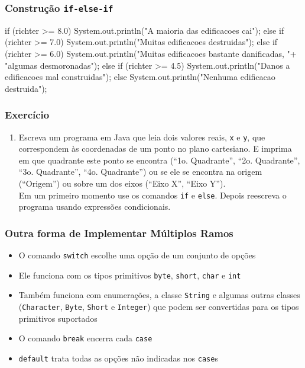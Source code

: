\documentclass[xcolor={dvipsnames,table},aspectratio=169]{beamer}
\begin{document}
\begin{frame}[fragile]\frametitle{Construção \texttt{if-else-if}}
{\footnotesize
\begin{javacode}
if (richter >= 8.0) {
   System.out.println("A maioria das edificacoes cai");
}
else if (richter >= 7.0) {
   System.out.println("Muitas edificacoes destruidas");
}
else if (richter >= 6.0) {
   System.out.println("Muitas edificacoes bastante danificadas, "+
                      "algumas desmoronadas");
}
else if (richter >= 4.5) {
   System.out.println("Danos a edificacoes mal construidas");
}
else {
   System.out.println("Nenhuma edificacao destruida");
}
\end{javacode}
}
\end{frame}

\begin{frame}\frametitle{Exercício}
\begin{enumerate}
	\item Escreva um programa em Java que leia dois valores reais, \texttt{x} e \texttt{y}, que correspondem às coordenadas de um ponto no plano cartesiano. E imprima em que quadrante este ponto se encontra (``1o. Quadrante'', ``2o. Quadrante'', ``3o. Quadrante'', ``4o. Quadrante'') ou se ele se encontra na origem (``Origem'') ou sobre um dos eixos (``Eixo X'', ``Eixo Y'').\\
Em um primeiro momento use os comandos \texttt{if} e \texttt{else}. Depois reescreva o programa usando expressões condicionais.
\end{enumerate}
\end{frame}

\begin{frame}\frametitle{Outra forma de Implementar Múltiplos Ramos}
\begin{itemize}
	\item O comando \texttt{switch} escolhe uma opção de um conjunto de opções
	\item Ele funciona com os tipos primitivos \texttt{byte}, \texttt{short}, \texttt{char} e \texttt{int}
	\item Também funciona com enumerações, a classe \texttt{String} e algumas outras classes (\texttt{Character}, \texttt{Byte}, \texttt{Short} e \texttt{Integer}) que podem ser convertidas para os tipos primitivos suportados
	\item O comando \texttt{break} encerra cada \texttt{case}
	\item \texttt{default} trata todas as opções não indicadas nos \texttt{case}s
\end{itemize}
\end{frame}
\end{document}
